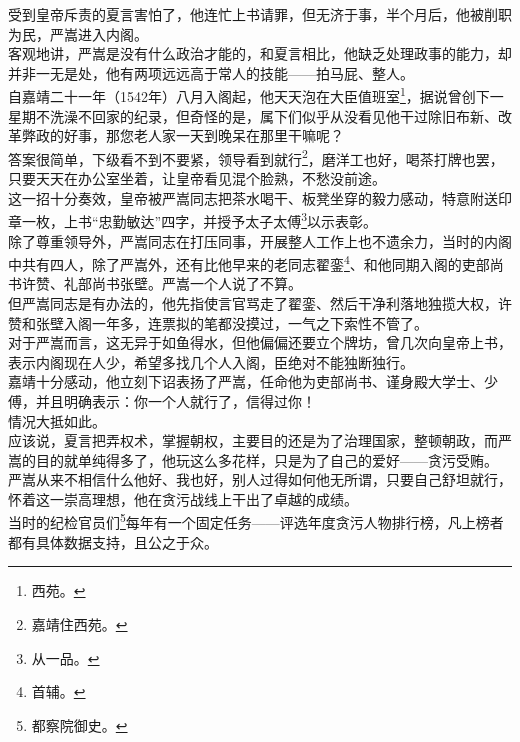 \begin{multicols}{\theparacolNo}
受到皇帝斥责的夏言害怕了，他连忙上书请罪，但无济于事，半个月后，他被削职为民，严嵩进入内阁。\\

客观地讲，严嵩是没有什么政治才能的，和夏言相比，他缺乏处理政事的能力，却并非一无是处，他有两项远远高于常人的技能——拍马屁、整人。\\

自嘉靖二十一年（1542年）八月入阁起，他天天泡在大臣值班室\footnote{西苑。}，据说曾创下一星期不洗澡不回家的纪录，但奇怪的是，属下们似乎从没看见他干过除旧布新、改革弊政的好事，那您老人家一天到晚呆在那里干嘛呢？\\

答案很简单，下级看不到不要紧，领导看到就行\footnote{嘉靖住西苑。}，磨洋工也好，喝茶打牌也罢，只要天天在办公室坐着，让皇帝看见混个脸熟，不愁没前途。\\

这一招十分奏效，皇帝被严嵩同志把茶水喝干、板凳坐穿的毅力感动，特意附送印章一枚，上书“忠勤敏达”四字，并授予太子太傅\footnote{从一品。}以示表彰。\\

除了尊重领导外，严嵩同志在打压同事，开展整人工作上也不遗余力，当时的内阁中共有四人，除了严嵩外，还有比他早来的老同志翟銮\footnote{首辅。}、和他同期入阁的吏部尚书许赞、礼部尚书张壁。严嵩一个人说了不算。\\

但严嵩同志是有办法的，他先指使言官骂走了翟銮、然后干净利落地独揽大权，许赞和张壁入阁一年多，连票拟的笔都没摸过，一气之下索性不管了。\\

对于严嵩而言，这无异于如鱼得水，但他偏偏还要立个牌坊，曾几次向皇帝上书，表示内阁现在人少，希望多找几个人入阁，臣绝对不能独断独行。\\

嘉靖十分感动，他立刻下诏表扬了严嵩，任命他为吏部尚书、谨身殿大学士、少傅，并且明确表示：你一个人就行了，信得过你！\\

情况大抵如此。\\

应该说，夏言把弄权术，掌握朝权，主要目的还是为了治理国家，整顿朝政，而严嵩的目的就单纯得多了，他玩这么多花样，只是为了自己的爱好——贪污受贿。\\

严嵩从来不相信什么他好、我也好，别人过得如何他无所谓，只要自己舒坦就行，怀着这一崇高理想，他在贪污战线上干出了卓越的成绩。\\

当时的纪检官员们\footnote{都察院御史。}每年有一个固定任务——评选年度贪污人物排行榜，凡上榜者都有具体数据支持，且公之于众。\\


\end{multicols}
